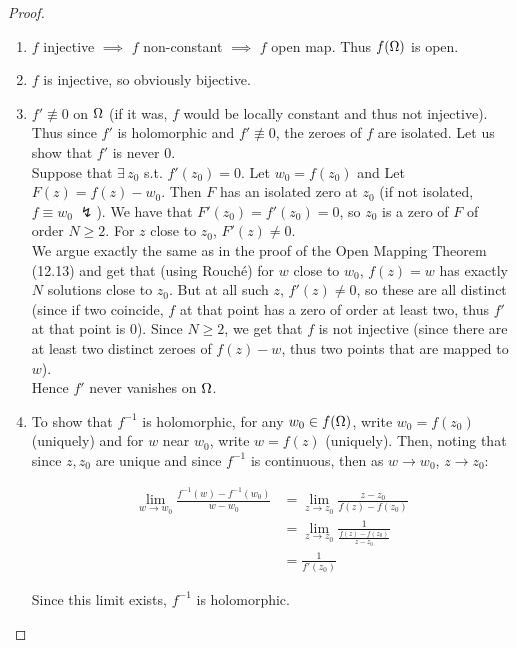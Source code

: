 \begin{proof}
\begin{enumerate}
    \item $f$ injective $\implies$ $f$ non-constant $\implies$ $f$ open map. Thus $f(\Omega)$ is open.
    \item $f$ is injective, so obviously bijective.
    \item $f' \nequiv 0$ on $\Omega$ (if it was, $f$ would be locally constant and thus not injective). Thus since $f'$ is holomorphic and $f' \nequiv 0$, the zeroes of $f$ are isolated. Let us show that $f'$ is never $0$.\\
    
    Suppose that $\exists \, z_0$ s.t. $f'(z_0) = 0$. Let $w_0 = f(z_0)$ and Let $F(z) = f(z) - w_0$. Then $F$ has an isolated zero at $z_0$ (if not isolated, $f \equiv w_0 \; \lightning$). We have that $F'(z_0) = f'(z_0) = 0$, so $z_0$ is a zero of $F$ of order $N \geq 2$. For $z$ close to $z_0$, $F'(z) \neq 0$.\\
    
    We argue exactly the same as in the proof of the Open Mapping Theorem (12.13) and get that (using Rouché) for $w$ close to $w_0$, $f(z) = w$ has exactly $N$ solutions close to $z_0$. But at all such $z$, $f'(z) \neq 0$, so these are all distinct (since if two coincide, $f$ at that point has a zero of order at least two, thus $f'$ at that point is 0). Since $N\geq 2$, we get that $f$ is not injective (since there are at least two distinct zeroes of $f(z) - w$, thus two points that are mapped to $w$).\\
    
    Hence $f'$ never vanishes on $\Omega$.
    \item To show that $f^{-1}$ is holomorphic, for any $w_0 \in f(\Omega)$, write $w_0 = f(z_0)$ (uniquely) and for $w$ near $w_0$, write $w = f(z)$ (uniquely). Then, noting that since $z,z_0$ are unique and since $f^{-1}$ is continuous, then as $w \to w_0$, $z \to z_0$:
    
    \begin{align*}
        \lim_{w \to w_0}\frac{f^{-1} (w) - f^{-1} (w_0)  }{w-w_0} &= \lim_{z \to z_0} \frac{z-z_0}{f(z) - f(z_0)}\\
        &= \lim_{z \to z_0} \frac{1}{\frac{f(z) - f(z_0)}{z-z_0}}\\
        &= \frac{1}{f'(z_0)}
    \end{align*}
    
    Since this limit exists, $f^{-1}$ is holomorphic.
\end{enumerate}
\end{proof}

